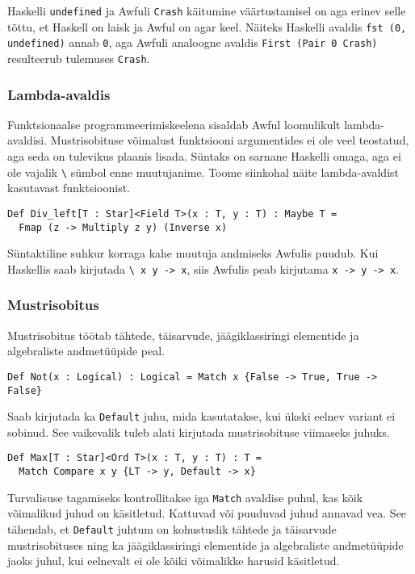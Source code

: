 \documentclass[12pt]{article}
\begin{document}
        Haskelli \verb!undefined! ja Awfuli \verb!Crash! käitumine väärtustamisel on aga erinev selle tõttu, et Haskell on laisk ja Awful on agar keel. Näiteks Haskelli avaldis \verb!fst (0, undefined)! annab \verb!0!, aga Awfuli analoogne avaldis \verb!First (Pair 0 Crash)! resulteerub tulemuses \verb!Crash!.
      \subsubsection{Lambda-avaldis}
        Funktsionaalse programmeerimiskeelena sisaldab Awful loomulikult lambda-avaldisi. Mustrisobituse võimalust funktsiooni argumentides ei ole veel teostatud, aga seda on tulevikus plaanis lisada. Süntaks on sarnane Haskelli omaga, aga ei ole vajalik \verb!\! sümbol enne muutujanime. Toome siinkohal näite lambda-avaldist kasutavast funktsioonist.

        \begin{verbatim}Def Div_left[T : Star]<Field T>(x : T, y : T) : Maybe T =
  Fmap (z -> Multiply z y) (Inverse x)\end{verbatim}

        Süntaktiline suhkur korraga kahe muutuja andmiseks Awfulis puudub. Kui Haskellis saab kirjutada \verb!\ x y -> x!, siis Awfulis peab kirjutama \verb!x -> y -> x!.
      \subsubsection{Mustrisobitus}\label{match}
        Mustrisobitus töötab tähtede, täisarvude, jäägiklassiringi elementide ja algebraliste andmetüüpide peal.

        \begin{verbatim}Def Not(x : Logical) : Logical = Match x {False -> True, True -> False}\end{verbatim}

        Saab kirjutada ka \verb!Default! juhu, mida kasutatakse, kui ükski eelnev variant ei sobinud. See vaikevalik tuleb alati kirjutada mustrisobituse viimaseks juhuks.

        \begin{verbatim}Def Max[T : Star]<Ord T>(x : T, y : T) : T =
  Match Compare x y {LT -> y, Default -> x}\end{verbatim}

        Turvalisuse tagamiseks kontrollitakse iga \verb!Match! avaldise puhul, kas kõik võimalikud juhud on käsitletud. Kattuvad või puuduvad juhud annavad vea. See tähendab, et \verb!Default! juhtum on kohustuslik tähtede ja täisarvude mustrisobituses ning ka jäägiklassiringi elementide ja algebraliste andmetüüpide jaoks juhul, kui eelnevalt ei ole kõiki võimalikke harusid käsitletud.
\end{document}
